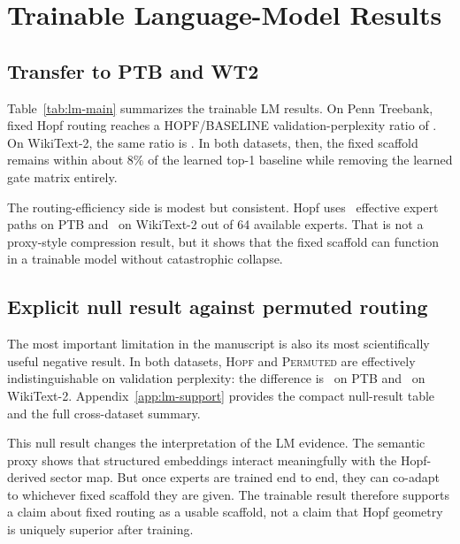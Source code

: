 \documentclass{article}
\begin{document}
\section{Trainable Language-Model Results}
\subsection{Transfer to PTB and WT2}
Table~\ref{tab:lm-main} summarizes the trainable LM results. On Penn Treebank, fixed Hopf routing reaches a HOPF/BASELINE validation-perplexity ratio of \PaperPTBHopfBaselineRatio. On WikiText-2, the same ratio is \PaperWTTwoHopfBaselineRatio. In both datasets, then, the fixed scaffold remains within about $8\%$ of the learned top-1 baseline while removing the learned gate matrix entirely.

\begin{table}[t]
  \centering
  \caption{Main trainable-LM result. Fixed Hopf routing partially transfers to a two-layer LM on both PTB and WikiText-2, but it does not improve over the permuted fixed-routing null. Table values are generated from canonical analysis exports under \texttt{paper1\_assets/}.}
  \label{tab:lm-main}
  \small
  \resizebox{\columnwidth}{!}{}
\end{table}

The routing-efficiency side is modest but consistent. Hopf uses \PaperPTBHopfEff\ effective expert paths on PTB and \PaperWTTwoHopfEff\ on WikiText-2 out of 64 available experts. That is not a proxy-style compression result, but it shows that the fixed scaffold can function in a trainable model without catastrophic collapse.

\subsection{Explicit null result against permuted routing}
\label{sec:null}
The most important limitation in the manuscript is also its most scientifically useful negative result. In both datasets, \textsc{Hopf} and \textsc{Permuted} are effectively indistinguishable on validation perplexity: the difference is \PaperPTBHopfPermDelta\ on PTB and \PaperWTTwoHopfPermDelta\ on WikiText-2. Appendix~\ref{app:lm-support} provides the compact null-result table and the full cross-dataset summary.

This null result changes the interpretation of the LM evidence. The semantic proxy shows that structured embeddings interact meaningfully with the Hopf-derived sector map. But once experts are trained end to end, they can co-adapt to whichever fixed scaffold they are given. The trainable result therefore supports a claim about fixed routing as a usable scaffold, not a claim that Hopf geometry is uniquely superior after training.
\end{document}
